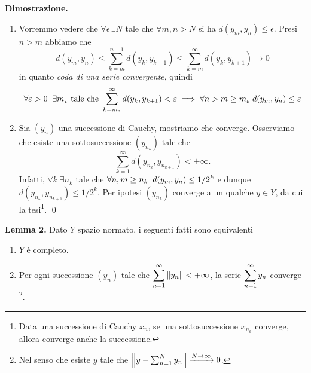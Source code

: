\textbf{Dimostrazione.}
\begin{enumerate}
	\item Vorremmo vedere che $\forall \epsilon \, \exists N$ tale che $\forall m, n > N$ si ha $d(y_m, y_n) \leq \epsilon$. 
		Presi $n > m$ abbiamo che 
		$$
		d(y_m, y_n) \leq \sum_{k=m}^{n-1} d(y_k, y_{k+1}) \leq \sum_{k=m}^\infty d(y_k, y_{k+1}) \to 0
		$$
		in quanto \textit{coda di una serie convergente}, quindi 
		$$
		\forall \varepsilon > 0 \;\; \exists m_\varepsilon \text{ tale che } \sum_{k = m_\varepsilon}^\infty d(y_k, y_{k+1})< \varepsilon \implies \forall n > m \geq m_\varepsilon \; d(y_m, y_n) \leq \varepsilon
		$$ 

	\item
		Sia $(y_n)$ una successione di Cauchy, mostriamo che converge.
		Osserviamo che esiste una sottosuccessione $\left( y_{n_k} \right)$ tale che
		$$
			\sum_{k=1}^\infty d(y_{n_k}, y_{n_{k+1}}) < +\infty.
		$$
		Infatti, $\forall k \; \exists n_k$ tale che $\forall n, m \geq n_k \;\; d(y_m, y_n) \leq 1 /2 ^k$ e dunque $d(y_{n_k}, y_{n_{k+1}}) \leq 1 / 2^k$.
		Per ipotesi $\left( y_{n_k} \right)$ converge a un qualche $y \in Y$, da cui la tesi\footnote{Data una successione di Cauchy $x_n$, se una sottosuccessione $x_{n_k}$ converge, allora converge anche la successione.}.
		\qed



\end{enumerate}



\hypertarget{prop:completeness_lemma_2}{}
\textbf{Lemma 2.} 
Dato $Y$ spazio normato, i seguenti fatti sono equivalenti
\begin{enumerate}
	\item $Y$ è completo.

	\item Per ogni successione $(y_n)$ tale che $\displaystyle \sum_{n=1}^\infty \left\lVert y_n \right\rVert < +\infty$, la serie $\displaystyle \sum_{n=1}^\infty y_n$ converge \footnote{Nel senso che esiste $y$ tale che $\left\lVert y - \sum_{n=1}^N y_n \right\rVert \xrightarrow{N \to \infty} 0$.}.
\end{enumerate}

